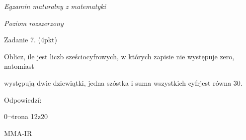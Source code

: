 \documentclass[a4paper,12pt]{article}
\begin{document}
{\it Egzamin maturalny z matematyki}

{\it Poziom rozszerzony}

Zadanie 7. (4pkt)

Oblicz, ile jest liczb sześciocyfrowych, w których zapisie nie występuje zero, natomiast

występują dwie dziewiątki, jedna szóstka i suma wszystkich cyfrjest równa 30.

Odpowiedzí:

$ 0\neg$trona 1$2\mathrm{z}20$

MMA-IR
\end{document}

